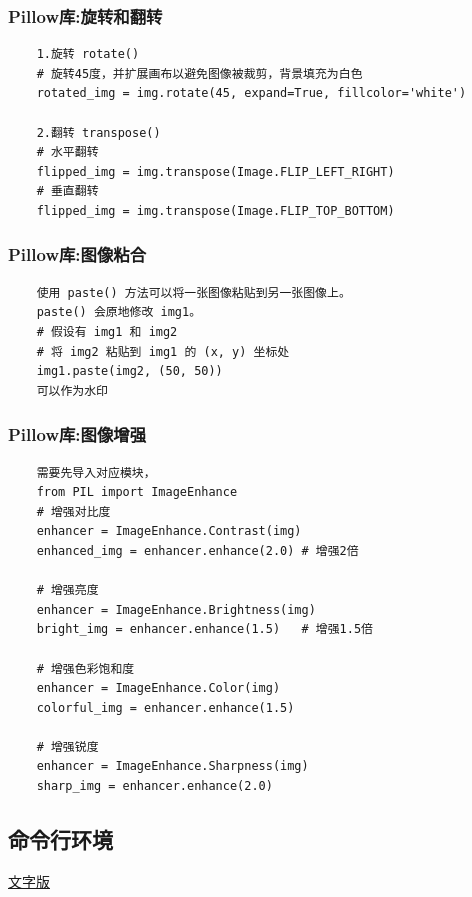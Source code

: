 \documentclass[UTF8]{ctexart}
\begin{document}
\subsubsection{Pillow库:旋转和翻转}
\begin{verbatim}
	1.旋转 rotate()
	# 旋转45度，并扩展画布以避免图像被裁剪，背景填充为白色
	rotated_img = img.rotate(45, expand=True, fillcolor='white')

	2.翻转 transpose()
	# 水平翻转
	flipped_img = img.transpose(Image.FLIP_LEFT_RIGHT)
	# 垂直翻转
	flipped_img = img.transpose(Image.FLIP_TOP_BOTTOM)
\end{verbatim}

\subsubsection{Pillow库:图像粘合}
\begin{verbatim}
	使用 paste() 方法可以将一张图像粘贴到另一张图像上。
	paste() 会原地修改 img1。
	# 假设有 img1 和 img2
	# 将 img2 粘贴到 img1 的 (x, y) 坐标处
	img1.paste(img2, (50, 50))
	可以作为水印
\end{verbatim}

\subsubsection{Pillow库:图像增强}
\begin{verbatim}
	需要先导入对应模块，
	from PIL import ImageEnhance
	# 增强对比度
	enhancer = ImageEnhance.Contrast(img)
	enhanced_img = enhancer.enhance(2.0) # 增强2倍

	# 增强亮度
	enhancer = ImageEnhance.Brightness(img)
	bright_img = enhancer.enhance(1.5)   # 增强1.5倍

	# 增强色彩饱和度
	enhancer = ImageEnhance.Color(img)
	colorful_img = enhancer.enhance(1.5)

	# 增强锐度
	enhancer = ImageEnhance.Sharpness(img)
	sharp_img = enhancer.enhance(2.0)
\end{verbatim}



\subsection{命令行环境}
\href{file:cmd-line-env.txt}{文字版}
\end{document}
